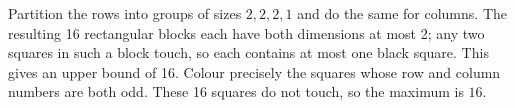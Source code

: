 Partition the rows into groups of sizes $2,2,2,1$ and do the same for columns. The resulting 16 rectangular blocks each have both dimensions at most 2; any two squares in such a block touch, so each contains at most one black square. This gives an upper bound of 16. Colour precisely the squares whose row and column numbers are both odd. These 16 squares do not touch, so the maximum is $\boxed{16}$.
